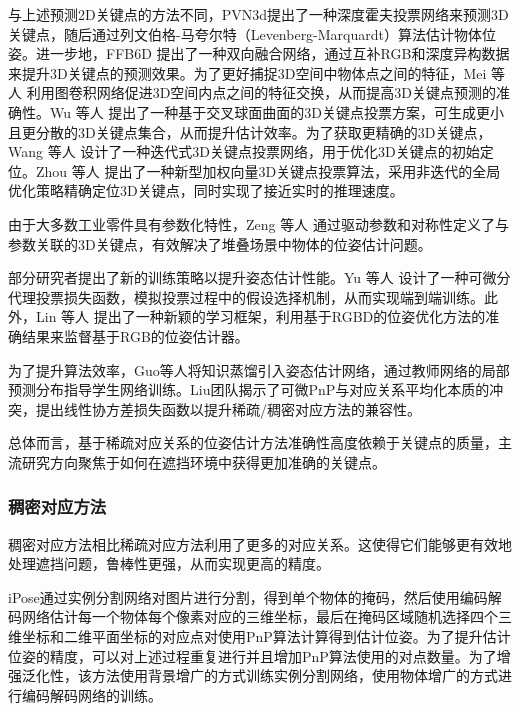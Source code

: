 \par 与上述预测2D关键点的方法不同，PVN3d\cite{he2020pvn3d}提出了一种深度霍夫投票网络来预测3D关键点，随后通过列文伯格-马夸尔特（Levenberg-Marquardt）算法\cite{Levenberg_Marquardt}估计物体位姿。进一步地，FFB6D\cite{he2021ffb6d} 提出了一种双向融合网络，通过互补RGB和深度异构数据来提升3D关键点的预测效果。为了更好捕捉3D空间中物体点之间的特征，Mei 等人\cite{mei2022spatial} 利用图卷积网络促进3D空间内点之间的特征交换，从而提高3D关键点预测的准确性。Wu 等人\cite{wu2022vote} 提出了一种基于交叉球面曲面的3D关键点投票方案，可生成更小且更分散的3D关键点集合，从而提升估计效率。为了获取更精确的3D关键点，Wang 等人\cite{wang2023kvnet} 设计了一种迭代式3D关键点投票网络，用于优化3D关键点的初始定位。Zhou 等人\cite{zhou2023deep} 提出了一种新型加权向量3D关键点投票算法，采用非迭代的全局优化策略精确定位3D关键点，同时实现了接近实时的推理速度。

\par 由于大多数工业零件具有参数化特性，Zeng 等人\cite{zeng2021parametricnet} 通过驱动参数和对称性定义了与参数关联的3D关键点，有效解决了堆叠场景中物体的位姿估计问题。

\par 部分研究者提出了新的训练策略以提升姿态估计性能。Yu 等人\cite{yu20206dof} 设计了一种可微分代理投票损失函数，模拟投票过程中的假设选择机制，从而实现端到端训练。此外，Lin 等人\cite{lin2022learning} 提出了一种新颖的学习框架，利用基于RGBD的位姿优化方法的准确结果来监督基于RGB的位姿估计器。

\par 为了提升算法效率，Guo等人\cite{guo2023knowledge}将知识蒸馏引入姿态估计网络，通过教师网络的局部预测分布指导学生网络训练。Liu团队\cite{liu2023linear}揭示了可微PnP与对应关系平均化本质的冲突，提出线性协方差损失函数以提升稀疏/稠密对应方法的兼容性。

\par 总体而言，基于稀疏对应关系的位姿估计方法准确性高度依赖于关键点的质量，主流研究方向聚焦于如何在遮挡环境中获得更加准确的关键点。

\subsubsection{稠密对应方法}\label{稠密对应方法}
\par 稠密对应方法相比稀疏对应方法利用了更多的对应关系。这使得它们能够更有效地处理遮挡问题，鲁棒性更强，从而实现更高的精度。

\par iPose\cite{hosseini2019ipose}通过实例分割网络对图片进行分割，得到单个物体的掩码，然后使用编码解码网络估计每一个物体每个像素对应的三维坐标，最后在掩码区域随机选择四个三维坐标和二维平面坐标的对应点对使用PnP算法计算得到估计位姿。为了提升估计位姿的精度，可以对上述过程重复进行并且增加PnP算法使用的对点数量。为了增强泛化性，该方法使用背景增广的方式训练实例分割网络，使用物体增广的方式进行编码解码网络的训练。

